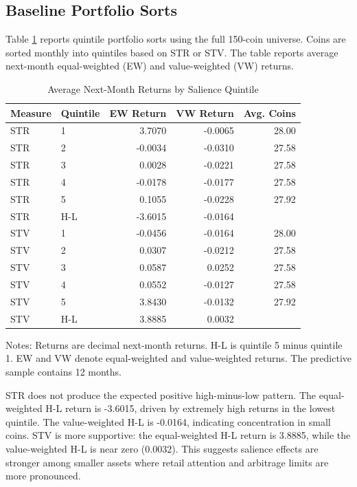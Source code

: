 \documentclass[11pt]{article}
\begin{document}
\subsection{Baseline Portfolio Sorts}

Table \ref{tab:table1} reports quintile portfolio sorts using the full 150-coin universe. Coins are sorted monthly into quintiles based on STR or STV. The table reports average next-month equal-weighted (EW) and value-weighted (VW) returns.

\begin{table}[H]
\centering
\footnotesize
\singlespacing
\setlength{\tabcolsep}{5pt}
\renewcommand{\arraystretch}{0.95}
\caption{Average Next-Month Returns by Salience Quintile}
\label{tab:table1}
\begin{tabular}{llrrr}
\toprule
Measure & Quintile & EW Return & VW Return & Avg. Coins \\
\midrule
STR & 1 & 3.7070 & -0.0065 & 28.00 \\
STR & 2 & -0.0034 & -0.0310 & 27.58 \\
STR & 3 & 0.0028 & -0.0221 & 27.58 \\
STR & 4 & -0.0178 & -0.0177 & 27.58 \\
STR & 5 & 0.1055 & -0.0228 & 27.92 \\
STR & H-L & -3.6015 & -0.0164 &  \\
\midrule
STV & 1 & -0.0456 & -0.0164 & 28.00 \\
STV & 2 & 0.0307 & -0.0212 & 27.58 \\
STV & 3 & 0.0587 & 0.0252 & 27.58 \\
STV & 4 & 0.0552 & -0.0127 & 27.58 \\
STV & 5 & 3.8430 & -0.0132 & 27.92 \\
STV & H-L & 3.8885 & 0.0032 &  \\
\bottomrule
\end{tabular}
\begin{flushleft}
\footnotesize Notes: Returns are decimal next-month returns. H-L is quintile 5 minus quintile 1. EW and VW denote equal-weighted and value-weighted returns. The predictive sample contains 12 months.
\end{flushleft}
\end{table}

STR does not produce the expected positive high-minus-low pattern. The equal-weighted H-L return is -3.6015, driven by extremely high returns in the lowest quintile. The value-weighted H-L is -0.0164, indicating concentration in small coins. STV is more supportive: the equal-weighted H-L return is 3.8885, while the value-weighted H-L is near zero (0.0032). This suggests salience effects are stronger among smaller assets where retail attention and arbitrage limits are more pronounced.
\end{document}
